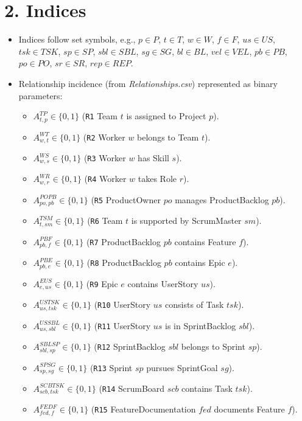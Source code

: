 \documentclass[11pt,a4paper]{article}
\begin{document}
\section{2. Indices}
\begin{itemize}[leftmargin=2.2em]
  \item Indices follow set symbols, e.g., $p\in P$, $t\in T$, $w\in W$, $f\in F$, $us\in US$, $tsk\in TSK$, $sp\in SP$, $sbl\in SBL$, $sg\in SG$, $bl\in BL$, $vel\in VEL$, $pb\in PB$, $po\in PO$, $sr\in SR$, $rep\in REP$.
  \item Relationship incidence (from \emph{Relationships.csv}) represented as binary parameters:
  \begin{itemize}
    \item $A^{TP}_{t,p}\in\{0,1\}$ (\texttt{R1} Team $t$ is assigned to Project $p$).
    \item $A^{WT}_{w,t}\in\{0,1\}$ (\texttt{R2} Worker $w$ belongs to Team $t$).
    \item $A^{WS}_{w,s}\in\{0,1\}$ (\texttt{R3} Worker $w$ has Skill $s$).
    \item $A^{WR}_{w,r}\in\{0,1\}$ (\texttt{R4} Worker $w$ takes Role $r$).
    \item $A^{POPB}_{po,pb}\in\{0,1\}$ (\texttt{R5} ProductOwner $po$ manages ProductBacklog $pb$).
    \item $A^{TSM}_{t,sm}\in\{0,1\}$ (\texttt{R6} Team $t$ is supported by ScrumMaster $sm$).
    \item $A^{PB F}_{pb,f}\in\{0,1\}$ (\texttt{R7} ProductBacklog $pb$ contains Feature $f$).
    \item $A^{PB E}_{pb,e}\in\{0,1\}$ (\texttt{R8} ProductBacklog $pb$ contains Epic $e$).
    \item $A^{E US}_{e,us}\in\{0,1\}$ (\texttt{R9} Epic $e$ contains UserStory $us$).
    \item $A^{US TSK}_{us,tsk}\in\{0,1\}$ (\texttt{R10} UserStory $us$ consists of Task $tsk$).
    \item $A^{US SBL}_{us,sbl}\in\{0,1\}$ (\texttt{R11} UserStory $us$ is in SprintBacklog $sbl$).
    \item $A^{SBL SP}_{sbl,sp}\in\{0,1\}$ (\texttt{R12} SprintBacklog $sbl$ belongs to Sprint $sp$).
    \item $A^{SP SG}_{sp,sg}\in\{0,1\}$ (\texttt{R13} Sprint $sp$ pursues SprintGoal $sg$).
    \item $A^{SCB TSK}_{scb,tsk}\in\{0,1\}$ (\texttt{R14} ScrumBoard $scb$ contains Task $tsk$).
    \item $A^{FED F}_{fed,f}\in\{0,1\}$ (\texttt{R15} FeatureDocumentation $fed$ documents Feature $f$).

\end{itemize}
\end{itemize}
\end{document}
